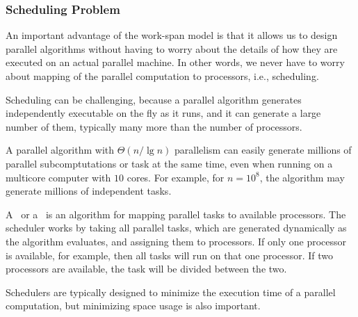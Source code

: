 \subsubsection{Scheduling Problem}
\label{sec:analysis::models::scheduling-problem}

\begin{flex}
\label{grp:grm:analysis::models::advantage}

\begin{gram}
\label{grm:analysis::models::advantage}
An important advantage of the work-span model is that it allows us to
design parallel algorithms without having to worry about the details
of how they are executed on an actual parallel machine. 
In other words, we never have to worry about mapping of the parallel
computation to processors, i.e., scheduling. 

Scheduling can be challenging, because a parallel algorithm generates
independently executable  on the fly as it runs, and it
can generate a large number of them, typically many more than the
number of processors.

\end{gram}

\begin{example}
\label{xmpl:analysis::models::parallel}
A parallel algorithm with $\Theta(n/\lg{n})$ parallelism can easily
generate millions of parallel subcomptutations or task at the same time,
even when running on a multicore computer with $10$ cores.
For example, for $n = 10^8$, the algorithm may generate millions of
independent tasks.

\end{example}
\end{flex}

\begin{cluster}
\label{grp:def:analysis::models::scheduler}

\begin{definition}[Scheduler]
\label{def:analysis::models::scheduler}
A~ or a~ is an algorithm
for mapping parallel tasks to available processors.
The scheduler works by taking all parallel tasks, which are generated
dynamically as the algorithm evaluates, and assigning them to
processors.  
If only one processor is available, for example, then all
tasks will run on that one processor.  If two processors are available,
the task will be divided between the two.

Schedulers are typically designed to minimize the execution time of a
parallel computation,
but 
minimizing space usage is also important.

\end{definition}
\end{cluster}

